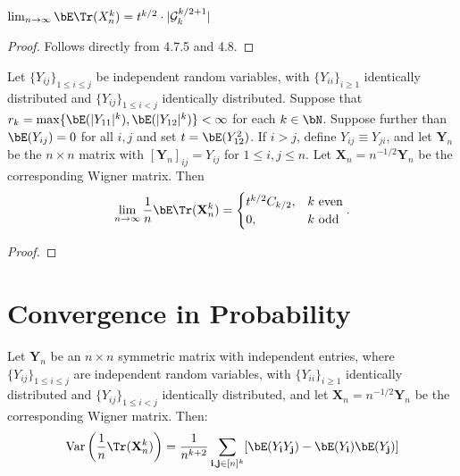 \begin{proposition}%
  \label{prop:trace_ev_limit_equals_t_special_g}
  \notready
  $\lim_{n\to\infty} \bE\Tr(X_n^k) = t^{k/2}\cdot|\mathcal{G}_k^{k/2+1}|$
\end{proposition}

\begin{proof}
  \notready
  Follows directly from 4.7.5 and 4.8.
\end{proof}


\begin{proposition}
  \label{prop:matrix_moments_convergence}
  \notready
  Let $\{Y_{ij}\}_{1\le i\le j}$ be independent random variables, with $\{Y_{ii}\}_{i\ge 1}$ identically distributed and $\{Y_{ij}\}_{1\le i<j}$ identically distributed.  Suppose that $r_k = \max\{\bE(|Y_{11}|^k),\bE(|Y_{12}|^k)\} <\infty$ for each $k\in\bN$.  Suppose further than $\bE(Y_{ij})=0$ for all $i,j$ and set $t=\bE(Y_{12}^2)$.  If $i>j$, define $Y_{ij} \equiv Y_{ji}$, and let $\mathbf{Y}_n$ be the $n\times n$ matrix with $[\mathbf{Y}_n]_{ij} = Y_{ij}$ for $1\le i,j\le n$.  Let $\mathbf{X}_n = n^{-1/2}\mathbf{Y}_n$ be the corresponding Wigner matrix.  Then
\[
\lim_{n\to\infty} \frac{1}{n}\bE\Tr(\mathbf{X}_n^k) = \begin{cases}
  t^{k/2}C_{k/2}, & k\text{ even} \\
  0, & k\text{ odd}
\end{cases}.
\]
\end{proposition}

\begin{proof}
\notready
\end{proof}


\section{Convergence in Probability}


\begin{lemma}
    \label{lem:variance_expansion}
    \notready
    Let $\mathbf{Y}_{n}$ be an $n \times n$ symmetric matrix with independent entries, where $\{Y_{ij}\}_{1\le i\le j}$ are independent random variables, with $\{Y_{ii}\}_{i\ge 1}$ identically distributed and $\{Y_{ij}\}_{1\le i<j}$ identically distributed, and let $\mathbf{X}_{n} = n^{-1 / 2}\mathbf{Y}_{n}$ be the corresponding Wigner matrix. Then:
    $$
    \operatorname{Var}\left(\frac{1}{n}\Tr(\mathbf{X}_{n}^{k})\right) = \frac{1}{n^{k+2}} \sum_{\mathbf{i}, \mathbf{j} \in [n]^{k}} [\bE(Y_{\mathbf{i}} Y_{\mathbf{j}}) - \bE(Y_{\mathbf{i}})\bE(Y_{\mathbf{j}})]
    $$
\end{lemma}

